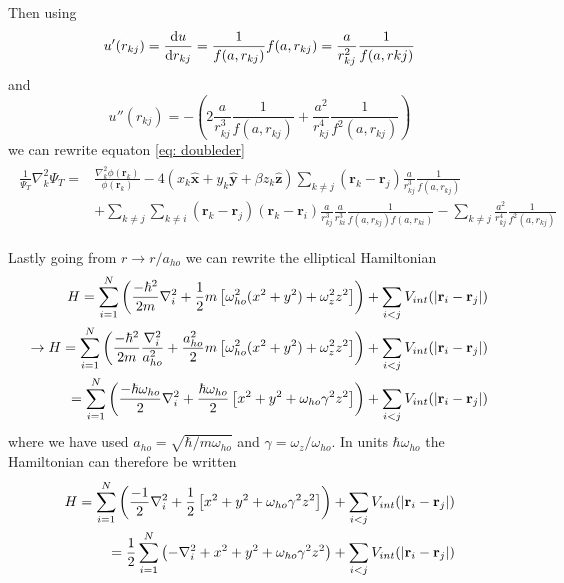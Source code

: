\documentclass[a4paper, 10pt, english]{revtex4-2} %
\begin{document}
        Then using 
        \begin{equation}
                u'(r_{kj})
            =   \derivative{u}{r_{kj}}
            =   \frac{1}{f(a, r_{kj})} f(a,r_{kj})
            =   \frac{a}{r_{kj}^2}\frac{1}{f(a, r{kj})}
        \end{equation}
        and
        \begin{equation}
                u''(r_{kj})
            =   - \left(2\frac{a}{r_{kj}^3}\frac{1}{f(a, r_{kj})} + \frac{a^2}{r_{kj}^4}\frac{1}{f^2(a, r_{kj})}\right)
        \end{equation}
        we can rewrite equaton \ref{eq: doubleder}
        \begin{align}
        \begin{split}
                \frac{1}{\Psi_T} \nabla_k^2 \Psi_T
            =   &\frac{\nabla_k^2 \phi(\mathbf{r}_k)}{\phi(\mathbf{r}_k)}
                - 4 \left(x_k\mathbf{\hat{x}} + y_k\mathbf{\hat{y}} + \beta z_k\mathbf{\hat{z}}\right) \sum_{k \neq j}(\mathbf{r}_k - \mathbf{r}_j)\frac{a}{r_{kj}^3}\frac{1}{f(a, r_{kj})} \\
                &+ \sum_{k\neq j}\sum_{k\neq i} (\mathbf{r}_k - \mathbf{r}_j)(\mathbf{r}_k - \mathbf{r}_i) \frac{a}{r_{kj}^3} \frac{a}{r_{ki}^3} \frac{1}{f(a, r_{kj})f(a, r_{ki})}
                - \sum_{k \neq j}\frac{a^2}{r_{kj}^4}\frac{1}{f^2(a, r_{kj})}
        \end{split}
        \end{align}

    Lastly going from $r \to r/a_{ho}$ we can rewrite the elliptical Hamiltonian
    \begin{align*}
            H 
        =   \sum_{i=1}^N \left(\frac{-\hbar^2}{2m}\nabla_i^2 + \frac{1}{2}m\left[\omega_{ho}^2(x^2 + y^2) + \omega_z^2 z^2\right]\right) + \sum_{i < j} V_{int}(\abs{\mathbf{r}_i - \mathbf{r}_j}) \\
        \to
            H
        =   \sum_{i=1}^{N} \left(\frac{-\hbar^2}{2m}\frac{\nabla_i^2}{a_{ho}^2} + \frac{a_{ho}^2}{2}m\left[\omega_{ho}^2(x^2 + y^2) + \omega_z^2 z^2\right]\right) + \sum_{i < j} V_{int}(\abs{\mathbf{r}_i - \mathbf{r}_j}) \\
        =   \sum_{i=1}^{N} \left(\frac{-\hbar \omega_{ho}}{2} \nabla_i^2 + \frac{\hbar \omega_{ho}}{2}\left[x^2 + y^2 + \omega_{ho} \gamma^2 z^2\right]\right) + \sum_{i < j} V_{int}(\abs{\mathbf{r}_i - \mathbf{r}_j})
    \end{align*}
    where we have used $a_{ho} = \sqrt{\hbar / m\omega_{ho}}$ and $\gamma = \omega_z/\omega_{ho}$.
    In units $\hbar\omega_{ho}$ the Hamiltonian can therefore be written
    \begin{align}
    \begin{split}
            H 
        =   \sum_{i=1}^{N} \left(\frac{-1}{2} \nabla_i^2 + \frac{1}{2}\left[x^2 + y^2 + \omega_{ho} \gamma^2 z^2\right]\right) + \sum_{i < j} V_{int}(\abs{\mathbf{r}_i - \mathbf{r}_j}) \\
        =   \frac{1}{2} \sum_{i=1}^{N} \left(-\nabla_i^2 + x^2 + y^2 + \omega_{ho} \gamma^2 z^2\right) + \sum_{i < j} V_{int}(\abs{\mathbf{r}_i - \mathbf{r}_j})
    \end{split}
    \end{align}
\end{document}

